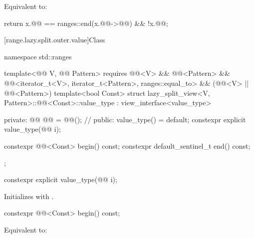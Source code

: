 \begin{itemdescr}
\pnum
\effects
Equivalent to:
\begin{codeblock}
return x.@@ == ranges::end(x.@@->@@) && !x.@@;
\end{codeblock}
\end{itemdescr}

[range.lazy.split.outer.value]{Class }

%
\begin{codeblock}
namespace std::ranges {
  template<@@ V, @@ Pattern>
    requires @@<V> && @@<Pattern> &&
             @@<iterator_t<V>, iterator_t<Pattern>, ranges::equal_to> &&
             (@@<V> || @@<Pattern>)
  template<bool Const>
  struct lazy_split_view<V, Pattern>::@@<Const>::value_type
    : view_interface<value_type> {
  private:
    @@ @@ = @@();               // \expos
  public:
    value_type() = default;
    constexpr explicit value_type(@@ i);

    constexpr @@<Const> begin() const;
    constexpr default_sentinel_t end() const;
  };
}
\end{codeblock}

%
\begin{itemdecl}
constexpr explicit value_type(@@ i);
\end{itemdecl}

\begin{itemdescr}
\pnum
\effects
Initializes  with .
\end{itemdescr}

%
\begin{itemdecl}
constexpr @@<Const> begin() const;
\end{itemdecl}

\begin{itemdescr}
\pnum
\effects
Equivalent to: 
\end{itemdescr}

